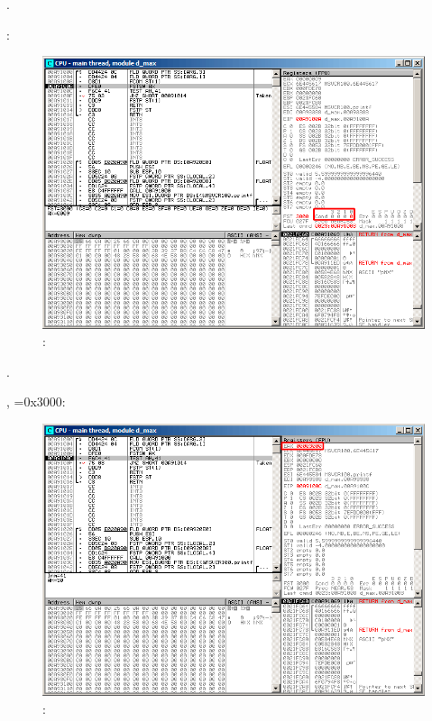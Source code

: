 \FCOM{}.

\clearpage
\FCOM {}:

\begin{figure}[H]
\centering
\includegraphics[scale=\FigScale]{patterns/12_FPU/3_comparison/x86/MSVC_Ox/olly2_2.png}
\caption{\olly: \FCOM {}}
\label{fig:FPU_comparison_Ox_case2_olly2}
\end{figure}

.

\clearpage
\FNSTSW {}, =0x3000:

\begin{figure}[H]
\centering
\includegraphics[scale=\FigScale]{patterns/12_FPU/3_comparison/x86/MSVC_Ox/olly2_3.png}
\caption{\olly: \FNSTSW {}}
\label{fig:FPU_comparison_Ox_case2_olly3}
\end{figure}

